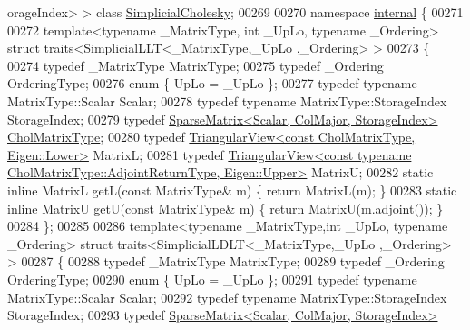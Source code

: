 \begin{DoxyCode}
      orageIndex> > \textcolor{keyword}{class }\hyperlink{group___sparse_cholesky___module_class_eigen_1_1_simplicial_cholesky}{SimplicialCholesky};
00269 
00270 \textcolor{keyword}{namespace }\hyperlink{namespaceinternal}{internal} \{
00271 
00272 \textcolor{keyword}{template}<\textcolor{keyword}{typename} \_MatrixType, \textcolor{keywordtype}{int} \_UpLo, \textcolor{keyword}{typename} \_Ordering> \textcolor{keyword}{struct }traits<SimplicialLLT<\_MatrixType,\_UpLo
      ,\_Ordering> >
00273 \{
00274   \textcolor{keyword}{typedef} \_MatrixType MatrixType;
00275   \textcolor{keyword}{typedef} \_Ordering OrderingType;
00276   \textcolor{keyword}{enum} \{ UpLo = \_UpLo \};
00277   \textcolor{keyword}{typedef} \textcolor{keyword}{typename} MatrixType::Scalar                         Scalar;
00278   \textcolor{keyword}{typedef} \textcolor{keyword}{typename} MatrixType::StorageIndex                   StorageIndex;
00279   \textcolor{keyword}{typedef} \hyperlink{group___sparse_core___module}{SparseMatrix<Scalar, ColMajor, StorageIndex>}        
      \hyperlink{group___sparse_core___module}{CholMatrixType};
00280   \textcolor{keyword}{typedef} \hyperlink{group___core___module_class_eigen_1_1_triangular_view}{TriangularView<const CholMatrixType, Eigen::Lower>}
        MatrixL;
00281   \textcolor{keyword}{typedef} 
      \hyperlink{group___core___module_class_eigen_1_1_triangular_view}{TriangularView<const typename CholMatrixType::AdjointReturnType, Eigen::Upper>}
         MatrixU;
00282   \textcolor{keyword}{static} \textcolor{keyword}{inline} MatrixL getL(\textcolor{keyword}{const} MatrixType& m) \{ \textcolor{keywordflow}{return} MatrixL(m); \}
00283   \textcolor{keyword}{static} \textcolor{keyword}{inline} MatrixU getU(\textcolor{keyword}{const} MatrixType& m) \{ \textcolor{keywordflow}{return} MatrixU(m.adjoint()); \}
00284 \};
00285 
00286 \textcolor{keyword}{template}<\textcolor{keyword}{typename} \_MatrixType,\textcolor{keywordtype}{int} \_UpLo, \textcolor{keyword}{typename} \_Ordering> \textcolor{keyword}{struct }traits<SimplicialLDLT<\_MatrixType,\_UpLo
      ,\_Ordering> >
00287 \{
00288   \textcolor{keyword}{typedef} \_MatrixType MatrixType;
00289   \textcolor{keyword}{typedef} \_Ordering OrderingType;
00290   \textcolor{keyword}{enum} \{ UpLo = \_UpLo \};
00291   \textcolor{keyword}{typedef} \textcolor{keyword}{typename} MatrixType::Scalar                             Scalar;
00292   \textcolor{keyword}{typedef} \textcolor{keyword}{typename} MatrixType::StorageIndex                       StorageIndex;
00293   \textcolor{keyword}{typedef} \hyperlink{group___sparse_core___module}{SparseMatrix<Scalar, ColMajor, StorageIndex>}         

\end{DoxyCode}
